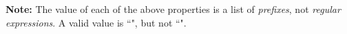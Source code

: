 {\bf Note:} The value of each of the above properties is a list of {\it prefixes},
not {\it regular expressions}.  A valid value is ``",
but not ``".


